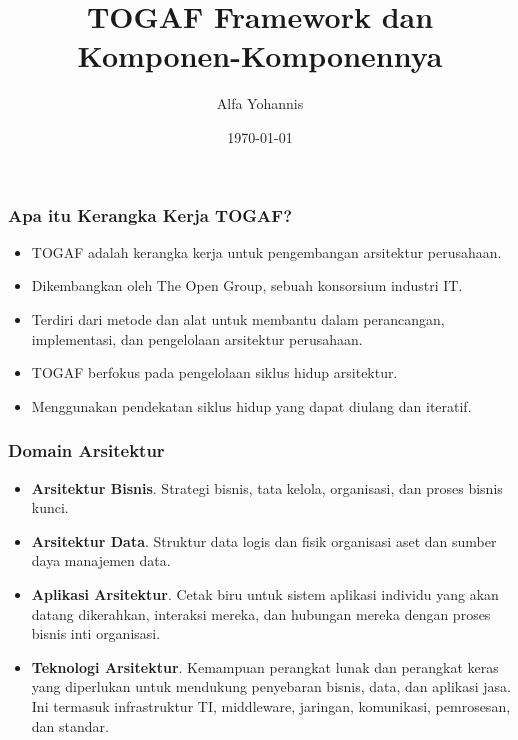 \documentclass[aspectratio=169]{beamer}
\title{TOGAF Framework dan Komponen-Komponennya}
\author{Alfa Yohannis}
\date{\today}
\begin{document}
	
	\frame{\titlepage}
	
	\begin{frame}
		\frametitle{Apa itu Kerangka Kerja TOGAF?}
		\begin{itemize}
			\item TOGAF adalah kerangka kerja untuk pengembangan arsitektur perusahaan.
			\item Dikembangkan oleh The Open Group, sebuah konsorsium industri IT.
			\item Terdiri dari metode dan alat untuk membantu dalam perancangan, implementasi, dan pengelolaan arsitektur perusahaan.
			\item TOGAF berfokus pada pengelolaan siklus hidup arsitektur.
			\item Menggunakan pendekatan siklus hidup yang dapat diulang dan iteratif.
		\end{itemize}
	\end{frame}
	
	\begin{frame}
		\frametitle{Domain Arsitektur}
		\begin{itemize}
			\item \textbf{Arsitektur Bisnis}. Strategi bisnis, tata kelola, organisasi, dan proses bisnis kunci.
			
			\item \textbf{Arsitektur Data}. Struktur data logis dan fisik organisasi
			aset dan sumber daya manajemen data.
			
			\item \textbf{Aplikasi Arsitektur}. Cetak biru untuk sistem aplikasi individu yang akan datang dikerahkan, interaksi mereka, dan hubungan mereka dengan proses bisnis inti organisasi.
			
			\item \textbf{Teknologi Arsitektur}. Kemampuan perangkat lunak dan perangkat keras yang diperlukan untuk mendukung penyebaran bisnis, data, dan aplikasi jasa. Ini termasuk infrastruktur TI, middleware, jaringan, komunikasi, pemrosesan, dan standar.
		\end{itemize}
	\end{frame}
	
\end{document}
